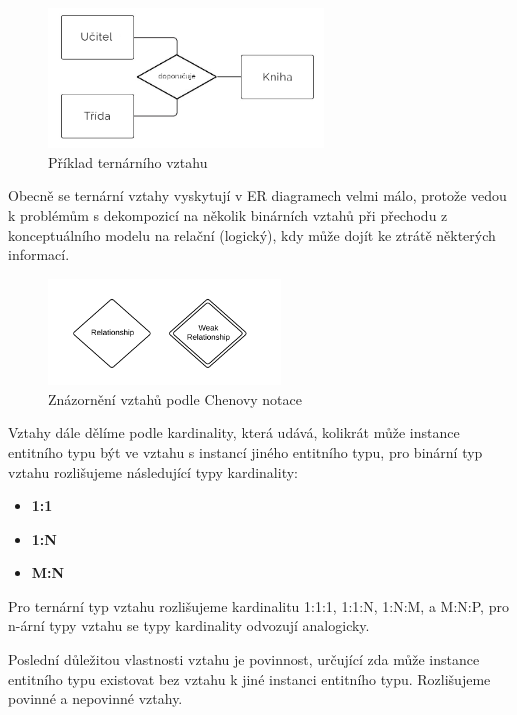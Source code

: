 \documentclass[czech,bachelor,public,dept460,male,oneside]{diploma}
\begin{document}
	\begin{figure}[!h]
		\centering
		\includegraphics[width=0.65\textwidth]{Figures/TernaryRelationship2}
		\caption{Příklad ternárního vztahu}
	\end{figure}

	Obecně se ternární vztahy vyskytují v ER diagramech velmi málo, protože vedou k problémům s dekompozicí na několik binárních vztahů při přechodu z konceptuálního modelu na relační (logický), kdy může dojít ke ztrátě některých informací.
	
	\begin{figure}[!h]
		\centering
		\includegraphics[width=0.55\textwidth]{Figures/ChenRelationships}
		\caption[Znázornění vztahů podle Chenovy notace]{Znázornění vztahů podle Chenovy notace \cite{erdSymbols}}
	\end{figure}

	Vztahy dále dělíme podle kardinality, která udává, kolikrát může instance entitního typu být ve vztahu s instancí jiného entitního typu, pro binární typ vztahu  rozlišujeme následující typy kardinality:
	
	\begin{itemize}
		\item \textbf{1:1}
		\item \textbf{1:N}
		\item \textbf{M:N}
	\end{itemize}

	Pro ternární typ vztahu rozlišujeme kardinalitu 1:1:1, 1:1:N, 1:N:M, a M:N:P, pro n-ární typy vztahu se typy kardinality odvozují analogicky.
	
	Poslední důležitou vlastnosti vztahu je povinnost, určující zda může instance entitního typu existovat bez vztahu k jiné instanci entitního typu. Rozlišujeme povinné a nepovinné vztahy.
	
\end{document}
